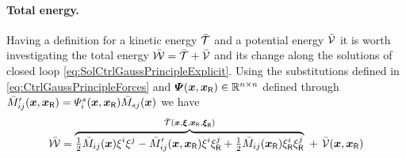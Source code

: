 \paragraph{Total energy.}
Having a definition for a kinetic energy $\bar{\mathcal{T}}$ and a potential energy $\bar{\mathcal{V}}$ it is worth investigating the total energy $\bar{\mathcal{W}} = \bar{\mathcal{T}} + \bar{\mathcal{V}}$ and its change along the solutions of closed loop \eqref{eq:SolCtrlGaussPrincipleExplicit}.
Using the substitutions defined in \eqref{eq:CtrlGaussPrincipleForces} and $\boldsymbol{\varPsi}(\boldsymbol{x}, \boldsymbol{x}_{\mathsf{R}}) \in \mathbb{R}^{n\times n}$ defined through $\bar{M}_{ij}'(\boldsymbol{x}, \boldsymbol{x}_{\mathsf{R}}) = \varPsi_{i}^{s}(\boldsymbol{x}, \boldsymbol{x}_{\mathsf{R}}) \bar{M}_{sj}(\boldsymbol{x})$ we have
\begin{align}
 \totalEnergyC &= \overbrace{\tfrac{1}{2} \sysInertiaMatCoeffC{\LidxI\LidxII}(\sysCoord) \sysVelCoeff{\LidxI} \sysVelCoeff{\LidxII}
 - \sysInertiaMatCoeffC{\LidxI\LidxII}'(\sysCoord, \sysCoordR) \sysVelCoeff{\LidxI} \sysVelCoeffR{\LidxII}
 + \tfrac{1}{2} \sysInertiaMatCoeffC{\LidxI\LidxII}(\sysCoordR) \sysVelCoeffR{\LidxI} \sysVelCoeffR{\LidxII}}^{\kineticEnergyC(\sysCoord, \sysVel, \sysCoordR, \sysVelR)}
 \ + \ \potentialEnergyC(\sysCoord, \sysCoordR)
\\[2ex]

\end{align}
